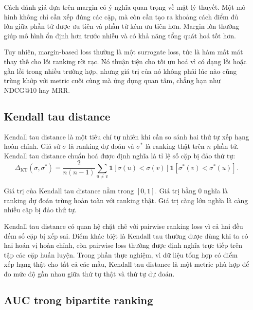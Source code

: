 Cách đánh giá dựa trên margin có ý nghĩa quan trọng về mặt lý thuyết. Một mô hình không chỉ cần xếp đúng các cặp, mà còn cần tạo ra khoảng cách điểm đủ lớn giữa phần tử được ưu tiên và phần tử kém ưu tiên hơn. Margin lớn thường giúp mô hình ổn định hơn trước nhiễu và có khả năng tổng quát hoá tốt hơn.

Tuy nhiên, margin-based loss thường là một surrogate loss, tức là hàm mất mát thay thế cho lỗi ranking rời rạc. Nó thuận tiện cho tối ưu hoá vì có dạng lồi hoặc gần lồi trong nhiều trường hợp, nhưng giá trị của nó không phải lúc nào cũng trùng khớp với metric cuối cùng mà ứng dụng quan tâm, chẳng hạn như NDCG@10 hay MRR.

\subsection{Kendall tau distance}

Kendall tau distance là một tiêu chí tự nhiên khi cần so sánh hai thứ tự xếp hạng hoàn chỉnh. Giả sử \(\sigma\) là ranking dự đoán và \(\sigma^\ast\) là ranking thật trên \(n\) phần tử. Kendall tau distance chuẩn hoá được định nghĩa là tỉ lệ số cặp bị đảo thứ tự:
\begin{equation}
    \Delta_{\text{KT}}(\sigma, \sigma^\ast)
    =
    \frac{2}{n(n-1)}
    \sum_{u \neq v}
    \mathbf{1}
    \left[
        \sigma(u) < \sigma(v)
    \right]
    \mathbf{1}
    \left[
        \sigma^\ast(v) < \sigma^\ast(u)
    \right].
    \label{eq:discussion-kendall-tau-distance}
\end{equation}

Giá trị của Kendall tau distance nằm trong \([0,1]\). Giá trị bằng \(0\) nghĩa là ranking dự đoán trùng hoàn toàn với ranking thật. Giá trị càng lớn nghĩa là càng nhiều cặp bị đảo thứ tự.

Kendall tau distance có quan hệ chặt chẽ với pairwise ranking loss vì cả hai đều đếm số cặp bị xếp sai. Điểm khác biệt là Kendall tau thường được dùng khi ta có hai hoán vị hoàn chỉnh, còn pairwise loss thường được định nghĩa trực tiếp trên tập các cặp huấn luyện. Trong phần thực nghiệm, vì dữ liệu tổng hợp có điểm xếp hạng thật cho tất cả các mẫu, Kendall tau distance là một metric phù hợp để đo mức độ gần nhau giữa thứ tự thật và thứ tự dự đoán.

\subsection{AUC trong bipartite ranking}

